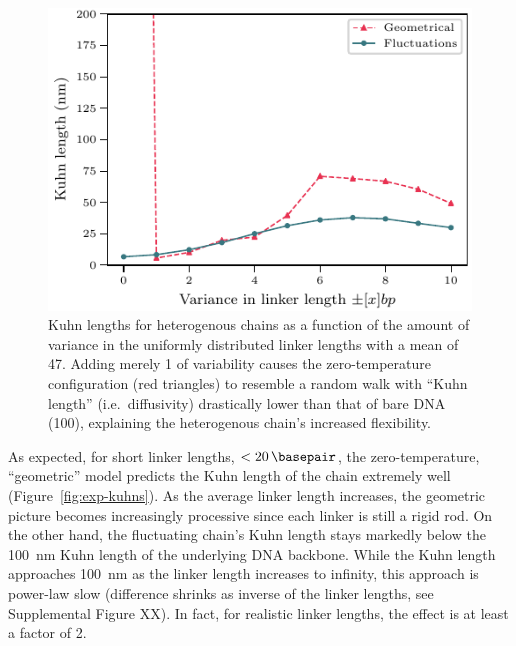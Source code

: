 \documentclass[%
 reprint,
superscriptaddress,
showpacs,preprintnumbers,
 amsmath,amssymb,
 aps,
 prl,
]{revtex4-1}
\begin{document}
\begin{figure}[t]
    \centering
    \label{fig:box-kuhns}
        \includegraphics[width=0.95\linewidth]{./figures/fig4_kuhn_length_vs_window_size_mu47bp.pdf}
    \caption{Kuhn lengths for heterogenous chains as a function of
     the amount of variance in the uniformly distributed linker lengths with a mean
     of \SI{47}{\basepair}. Adding merely \SI{1}{\basepair} of variability causes the
     zero-temperature configuration (red triangles) to resemble a random walk with ``Kuhn
     length'' (i.e.\ diffusivity) drastically lower than that of bare DNA
     (\SI{100}{\basepair}), explaining the heterogenous chain's increased
    flexibility.}%
\end{figure}

As expected, for short linker lengths, $<\SI{20}{\basepair}$, the
    zero-temperature, ``geometric'' model predicts the Kuhn length of the chain
    extremely well (Figure~\ref{fig:exp-kuhns}).
As the average linker length
    increases, the geometric picture becomes increasingly processive since each
    linker is still a rigid rod.
On the other hand, the fluctuating chain's Kuhn length stays markedly below the
    \SI{100}{\nano\metre} Kuhn length of the underlying DNA backbone.
While the Kuhn length approaches \SI{100}{\nano\metre} as the linker length
    increases to infinity, this approach is power-law slow (difference shrinks
    as inverse of the linker lengths, see Supplemental Figure XX).
In fact, for realistic linker lengths, the effect is at least a factor of 2.
\end{document}
